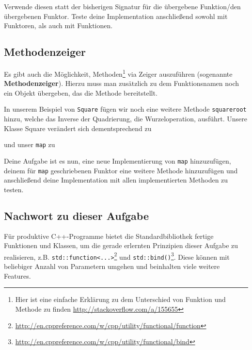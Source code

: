 Verwende diesen statt der bisherigen Signatur für die übergebene Funktion/den übergebenen Funktor.
Teste deine Implementation anschließend sowohl mit Funktoren, als auch mit Funktionen.

\subsection{Methodenzeiger}
\label{sec:functional_method}
Es gibt auch die Möglichkeit, Methoden\footnote{Hier ist eine einfache Erklärung zu dem Unterschied von Funktion und Methode zu finden \url{http://stackoverflow.com/a/155655}} via Zeiger auszuführen (sogenannte \textbf{Methodenzeiger}).
Hierzu muss man zusätzlich zu dem Funktionsnamen noch ein Objekt übergeben, das die Methode bereitstellt.

In unserem Beispiel von \lstinline{Square} fügen wir noch eine weitere Methode \lstinline{squareroot} hinzu, welche das Inverse der Quadrierung, die Wurzeloperation, ausführt.
Unsere Klasse Square verändert sich dementsprechend zu


und unser \lstinline{map} zu 


Deine Aufgabe ist es nun, eine neue Implementierung von \lstinline{map} hinzuzufügen, deinem für \lstinline{map} geschriebenen Funktor eine weitere Methode hinzuzufügen und anschließend deine Implementation mit allen implementierten Methoden zu testen.

\subsection*{Nachwort zu dieser Aufgabe}
Für produktive C++-Programme bietet die Standardbibliothek fertige Funktionen und Klassen, um die gerade erlernten Prinzipien dieser Aufgabe zu realisieren, z.B. \lstinline{std::function<...>}\footnote{\url{http://en.cppreference.com/w/cpp/utility/functional/function}} und \lstinline{std::bind()}\footnote{\url{http://en.cppreference.com/w/cpp/utility/functional/bind}}.
Diese können mit beliebiger Anzahl von Parametern umgehen und beinhalten viele weitere Features.
